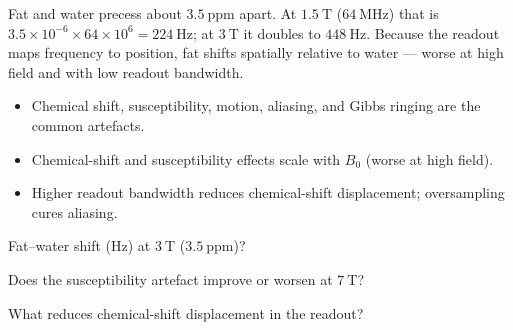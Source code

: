 \begin{workedexample}
Fat and water precess about $3.5\ \text{ppm}$ apart. At $1.5\ \text{T}$
($64\ \text{MHz}$) that is $3.5\times10^{-6}\times64\times10^6 = 224\ \text{Hz}$; at
$3\ \text{T}$ it doubles to $448\ \text{Hz}$. Because the readout maps frequency to
position, fat shifts spatially relative to water --- worse at high field and with
low readout bandwidth.
\end{workedexample}

\begin{keytakeaways}
\begin{itemize}[leftmargin=1.4em,itemsep=2pt]
\item Chemical shift, susceptibility, motion, aliasing, and Gibbs ringing are the common artefacts.
\item Chemical-shift and susceptibility effects scale with $B_0$ (worse at high field).
\item Higher readout bandwidth reduces chemical-shift displacement; oversampling cures aliasing.
\end{itemize}
\end{keytakeaways}

\begin{exercises}
\item Fat--water shift (Hz) at $3\ \text{T}$ ($3.5\ \text{ppm}$)?
\item Does the susceptibility artefact improve or worsen at $7\ \text{T}$?
\item What reduces chemical-shift displacement in the readout?
\end{exercises}

